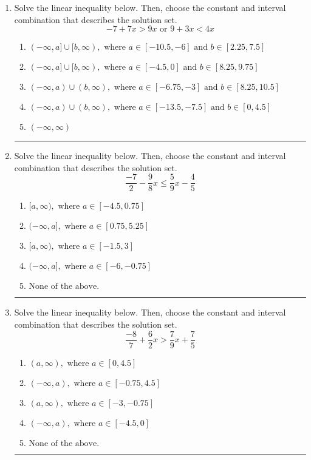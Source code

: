 \documentclass[14pt]{extbook}
\newcommand{\litem}[1]{\item#1\hspace*{-1cm}\rule{\textwidth}{0.4pt}}
\begin{document}
\begin{enumerate}
{\begin{enumerate}[label=\Alph*.]
\end{enumerate} }
\litem{
Solve the linear inequality below. Then, choose the constant and interval combination that describes the solution set.\[ -7 + 7 x > 9 x \text{ or } 9 + 3 x < 4 x \]\begin{enumerate}[label=\Alph*.]
\item \( (-\infty, a] \cup [b, \infty), \text{ where } a \in [-10.5, -6] \text{ and } b \in [2.25, 7.5] \)
\item \( (-\infty, a] \cup [b, \infty), \text{ where } a \in [-4.5, 0] \text{ and } b \in [8.25, 9.75] \)
\item \( (-\infty, a) \cup (b, \infty), \text{ where } a \in [-6.75, -3] \text{ and } b \in [8.25, 10.5] \)
\item \( (-\infty, a) \cup (b, \infty), \text{ where } a \in [-13.5, -7.5] \text{ and } b \in [0, 4.5] \)
\item \( (-\infty, \infty) \)

\end{enumerate} }
\litem{
Solve the linear inequality below. Then, choose the constant and interval combination that describes the solution set.\[ \frac{-7}{2} - \frac{9}{8} x \leq \frac{5}{9} x - \frac{4}{5} \]\begin{enumerate}[label=\Alph*.]
\item \( [a, \infty), \text{ where } a \in [-4.5, 0.75] \)
\item \( (-\infty, a], \text{ where } a \in [0.75, 5.25] \)
\item \( [a, \infty), \text{ where } a \in [-1.5, 3] \)
\item \( (-\infty, a], \text{ where } a \in [-6, -0.75] \)
\item \( \text{None of the above}. \)

\end{enumerate} }
\litem{
Solve the linear inequality below. Then, choose the constant and interval combination that describes the solution set.\[ \frac{-8}{7} + \frac{6}{2} x > \frac{7}{9} x + \frac{7}{5} \]\begin{enumerate}[label=\Alph*.]
\item \( (a, \infty), \text{ where } a \in [0, 4.5] \)
\item \( (-\infty, a), \text{ where } a \in [-0.75, 4.5] \)
\item \( (a, \infty), \text{ where } a \in [-3, -0.75] \)
\item \( (-\infty, a), \text{ where } a \in [-4.5, 0] \)
\item \( \text{None of the above}. \)


\end{enumerate}}
\end{enumerate}
\end{document}
